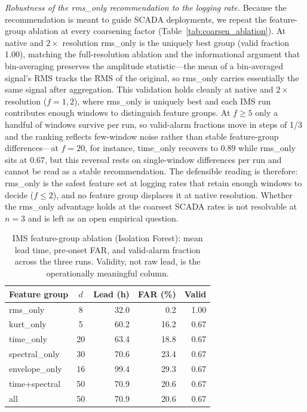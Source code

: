 \documentclass[IJPHM, 2026, 0]{PHMSociety}
\begin{document}
\emph{Robustness of the rms\_only recommendation to the logging rate.} Because the recommendation is meant to guide SCADA deployments, we repeat the feature-group ablation at every coarsening factor (Table~\ref{tab:coarsen_ablation}). At native and $2\times$ resolution rms\_only is the uniquely best group (valid fraction 1.00), matching the full-resolution ablation and the informational argument that bin-averaging preserves the amplitude statistic---the mean of a bin-averaged signal's RMS tracks the RMS of the original, so rms\_only carries essentially the same signal after aggregation. This validation holds cleanly at native and $2\times$ resolution ($f=1,2$), where rms\_only is uniquely best and each IMS run contributes enough windows to distinguish feature groups. At $f \ge 5$ only a handful of windows survive per run, so valid-alarm fractions move in steps of 1/3 and the ranking reflects few-window noise rather than stable feature-group differences---at $f=20$, for instance, time\_only recovers to 0.89 while rms\_only sits at 0.67, but this reversal rests on single-window differences per run and cannot be read as a stable recommendation. The defensible reading is therefore: rms\_only is the safest feature set at logging rates that retain enough windows to decide ($f \le 2$), and no feature group displaces it at native resolution. Whether the rms\_only advantage holds at the coarsest SCADA rates is not resolvable at $n=3$ and is left as an open empirical question.

\begin{table}[t] \small
	\begin{center}
	\caption{IMS feature-group ablation (Isolation Forest): mean lead time, pre-onset FAR, and valid-alarm fraction across the three runs. Validity, not raw lead, is the operationally meaningful column.}
	\label{tab:ablation}
	\begin{tabular}{l c r r r}
		\hline \hline
		\textbf{Feature group} & \textbf{$d$} & \textbf{Lead (h)} & \textbf{FAR (\%)} & \textbf{Valid} \\
		\hline
		rms\_only & 8 & 32.0 & 0.2 & 1.00 \\
		kurt\_only & 5 & 60.2 & 16.2 & 0.67 \\
		time\_only & 20 & 63.4 & 18.8 & 0.67 \\
		spectral\_only & 30 & 70.6 & 23.4 & 0.67 \\
		envelope\_only & 16 & 99.4 & 29.3 & 0.67 \\
		time+spectral & 50 & 70.9 & 20.6 & 0.67 \\
		all & 50 & 70.9 & 20.6 & 0.67 \\
		\hline \hline
	\end{tabular}
	\end{center}
\end{table}
\end{document}
